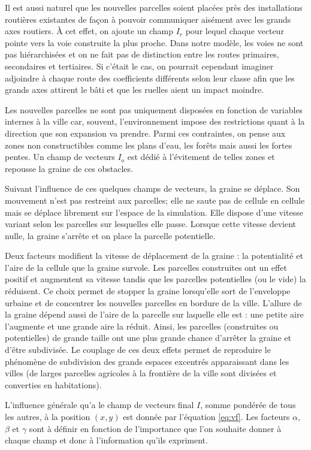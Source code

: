 \documentclass[12pt]{article}
\begin{document}
Il est aussi naturel que les nouvelles parcelles soient placées près
des installations routières existantes de façon à pouvoir communiquer
aisément avec les grands axes routiers. À cet effet, on ajoute un
champ $I_r$ pour lequel chaque vecteur pointe vers la voie construite
la plus proche. Dans notre modèle, les voies ne sont pas hiérarchisées
et on ne fait pas de distinction entre les routes primaires,
secondaires et tertiaires. Si c'était le cas, on pourrait cependant
imaginer adjoindre à chaque route des coefficients différents selon
leur classe afin que les grands axes attirent le bâti et que les
ruelles aient un impact moindre.

Les nouvelles parcelles ne sont pas uniquement disposées en fonction
de variables internes à la ville car, souvent, l'environnement impose
des restrictions quant à la direction que son expansion va
prendre. Parmi ces contraintes, on pense aux zones non constructibles
comme les plans d'eau, les forêts mais aussi les fortes pentes. Un
champ de vecteurs $I_o$ est dédié à l'évitement de telles zones et
repousse la graine de ces obstacles.

Suivant l'influence de ces quelques champs de vecteurs, la graine se
déplace. Son mouvement n'est pas restreint aux parcelles; elle ne
saute pas de cellule en cellule mais se déplace librement sur l'espace
de la simulation. Elle dispose d'une vitesse variant selon les
parcelles sur lesquelles elle passe. Lorsque cette vitesse devient
nulle, la graine s'arrête et on place la parcelle potentielle.

Deux facteurs modifient la vitesse de déplacement de la graine : la
potentialité et l'aire de la cellule que la graine survole. Les
parcelles construites ont un effet positif et augmentent sa vitesse
tandis que les parcelles potentielles (ou le vide) la réduisent. Ce
choix permet de stopper la graine lorsqu'elle sort de l'enveloppe
urbaine et de concentrer les nouvelles parcelles en bordure de la
ville. L'allure de la graine dépend aussi de l'aire de la parcelle sur
laquelle elle est : une petite aire l'augmente et une grande aire la
réduit. Ainsi, les parcelles (construites ou potentielles) de grande
taille ont une plus grande chance d'arrêter la graine et d'être
subdivisée. Le couplage de ces deux effets permet de reproduire le
phénomène de subdivision des grands espaces excentrés apparaissant
dans les villes (de larges parcelles agricoles à la frontière de la
ville sont divisées et converties en habitations).

L'influence générale qu'a le champ de vecteurs final $I$, somme
pondérée de tous les autres, à la position $(x,y)$ est donnée par
l'équation \ref{eq:vf}. Les facteurs $\alpha$, $\beta$ et $\gamma$
sont à définir en fonction de l'importance que l'on souhaite donner à
chaque champ et donc à l'information qu'ils expriment.
\end{document}
